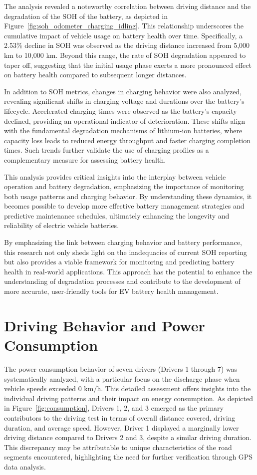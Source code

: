 The analysis revealed a noteworthy correlation between driving distance and the degradation of the \gls{SOH} of the battery, as depicted in Figure~\ref{fig:soh_odometer_charging_idling}. 
This relationship underscores the cumulative impact of vehicle usage on battery health over time. 
Specifically, a 2.53\% decline in \gls{SOH} was observed as the driving distance increased from 5,000 km to 10,000 km. 
Beyond this range, the rate of \gls{SOH} degradation appeared to taper off, suggesting that the initial usage phase exerts a more pronounced effect on battery health compared to subsequent longer distances.

In addition to \gls{SOH} metrics, changes in charging behavior were also analyzed, revealing significant shifts in charging voltage and durations over the battery's lifecycle. 
Accelerated charging times were observed as the battery's capacity declined, providing an operational indicator of deterioration. 
These shifts align with the fundamental degradation mechanisms of lithium-ion batteries, where capacity loss leads to reduced energy throughput and faster charging completion times. 
Such trends further validate the use of charging profiles as a complementary measure for assessing battery health.

This analysis provides critical insights into the interplay between vehicle operation and battery degradation, emphasizing the importance of monitoring both usage patterns and charging behavior. 
By understanding these dynamics, it becomes possible to develop more effective battery management strategies and predictive maintenance schedules, ultimately enhancing the longevity and reliability of electric vehicle batteries.

By emphasizing the link between charging behavior and battery performance, this research not only sheds light on the inadequacies of current \gls{SOH} reporting but also provides a viable framework for monitoring and predicting battery health in real-world applications. 
This approach has the potential to enhance the understanding of degradation processes and contribute to the development of more accurate, user-friendly tools for \gls{EV} battery health management.


\section{Driving Behavior and Power Consumption}

The power consumption behavior of seven drivers (Drivers 1 through 7) was systematically analyzed, with a particular focus on the discharge phase when vehicle speeds exceeded 0 km/h. 
This detailed assessment offers insights into the individual driving patterns and their impact on energy consumption. As depicted in Figure~\ref{fig:consumption}, 
Drivers 1, 2, and 3 emerged as the primary contributors to the driving test in terms of overall distance covered, driving duration, and average speed. 
However, Driver 1 displayed a marginally lower driving distance compared to Drivers 2 and 3, despite a similar driving duration. 
This discrepancy may be attributable to unique characteristics of the road segments encountered, highlighting the need for further verification through \gls{GPS} data analysis.


